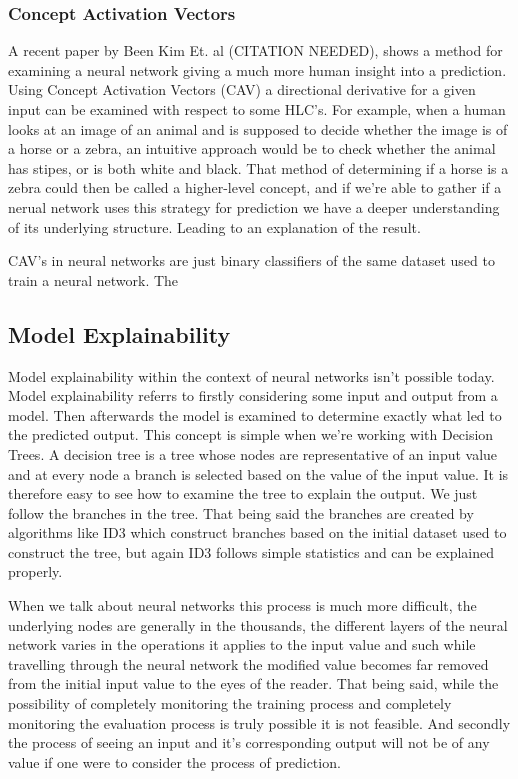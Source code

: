 \subsubsection{Concept Activation Vectors}

A recent paper by Been Kim Et. al (CITATION NEEDED), shows a method for examining
a neural network giving a much more human insight into a prediction. Using Concept
Activation Vectors (CAV) a directional derivative for a given input can be examined
with respect to some HLC's. For example, when a human looks at an image of an animal
and is supposed to decide whether the image is of a horse or a zebra, an intuitive
approach would be to check whether the animal has stipes, or is both white and black.
That method of determining if a horse is a zebra could then be called a higher-level
concept, and if we're able to gather if a nerual network uses this strategy for prediction 
we have a deeper understanding of its underlying structure. Leading to an explanation of 
the result.

CAV's in neural networks are just binary classifiers of the same dataset used to train
a neural network. The 

\subsection{Model Explainability}

Model explainability within the context of neural networks isn't possible today. Model
explainability referrs to firstly considering some input and output from a model. Then
afterwards the model is examined to determine exactly what led to the predicted output.
This concept is simple when we're working with Decision Trees. A decision tree is a tree
whose nodes are representative of an input value and at every node a branch is selected
based on the value of the input value. It is therefore easy to see how to examine the tree
to explain the output. We just follow the branches in the tree. That being said the branches
are created by algorithms like ID3 which construct branches based on the initial dataset used
to construct the tree, but again ID3 follows simple statistics and can be explained properly.

When we talk about neural networks this process is much more difficult, the underlying nodes
are generally in the thousands, the different layers of the neural network varies in the operations
it applies to the input value and such while travelling through the neural network the modified
value becomes far removed from the initial input value to the eyes of the reader. That being said,
while the possibility of completely monitoring the training process and completely monitoring the
evaluation process is truly possible it is not feasible. And secondly the process of seeing an
input and it's corresponding output will not be of any value if one were to consider the process
of prediction.

